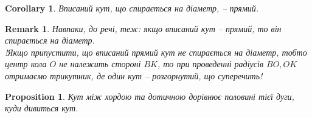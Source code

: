 \documentclass[a4paper, 10pt]{article}
\theoremstyle{theoremdd}
\theoremstyle{theoremdd}
\theoremstyle{theoremdd}
\theoremstyle{theoremdd}
\theoremstyle{theoremdd}
\theoremstyle{theoremdd}
\newtheorem{proposition}[theorem]{Proposition}
\theoremstyle{theoremdd}
\newtheorem{remark}[theorem]{Remark}
\theoremstyle{theoremdd}
\theoremstyle{theoremdd}
\newtheorem{corollary}[theorem]{Corollary}
\begin{document}
\begin{corollary}
Вписаний кут, що спирається на діаметр, -- прямий.
\begin{figure}[H]
\centering
{}
\end{figure}
\end{corollary}

\begin{remark}
Навпаки, до речі, теж: якщо вписаний кут -- прямий, то він спирається на діаметр.\\
!Якщо припустити, що вписаний прямий кут не спирається на діаметр, тобто центр кола $O$ не належить стороні $BK$, то при проведенні радіусів $BO,OK$ отримаємо трикутник, де один кут -- розгорнутий, що суперечить!
\end{remark}

\begin{proposition}
Кут між хордою та дотичною дорівнює половині тієї дуги, куди дивиться кут.
\end{proposition}
\end{document}
